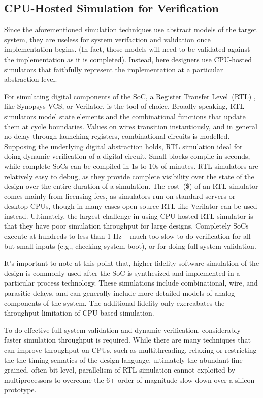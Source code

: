 \subsection{CPU-Hosted Simulation for Verification}

Since the aforementioned simulation techniques use abstract models of the
target system, they are useless for system verifaction and validation once
implementation begins. (In fact, those models will need to be validated against the
implementation as it is completed). Instead, here designers use CPU-hosted
simulators that faithfully represent the implementation at a particular
abstraction level.

For simulating digital components of the SoC, a Register Transfer Level~(RTL) ,
like Synopsys VCS, or Verilator, is the tool of choice. Broadly speaking, RTL
simulators model state elements and the combinational functions that update
them at cycle boundaries. Values on wires transition instantiously, and in
general no delay through launching registers, combinational circuits is
modelled. Supposing the underlying digital abstraction holds, RTL simulation
ideal for doing dynamic verification of a digital circuit. Small blocks compile
in seconds, while complete SoCs can be compiled in 1s to 10s of minutes. RTL
simulators are relatively easy to debug, as they provide complete visibility
over the state of the design over the entire duration of a simulation. The
cost~(\$) of an RTL simulator comes mainly from licensing fees, as simulators
run on standard servers or desktop CPUs, though in many cases open-source RTL
like Verilator can be used instead. Ultimately, the largest challenge in using
CPU-hosted RTL simulator is that they have poor simulation throughput for large
designs. Completely SoCs execute at hundreds to less than 1 Hz -- much too slow
to do verification for all but small inputs (e.g., checking system boot), or
for doing full-system validation.

It's important to note at this point that, higher-fidelity software simulation
of the design is commonly used after the SoC is synthesized and implemented in
a particular process technology.  These simulations include combinational,
wire, and parasitic delays, and can generally include more detailed models of
analog components of the system. The additional fidelity only exercabates the
throughput limitation of CPU-based simulation.

To do effective full-system validation and dynamic verification, considerably
faster simulation throughput is required. While there are many techniques that
can improve throughput on CPUs, such as multithreading, relaxing or restricting
the the timing sematics of the design language, ultimately the abundant
fine-grained, often bit-level, parallelism of RTL simulation cannot exploited
by multiprocessors to overcome the 6+ order of magnitude slow down over a
silicon prototype.

